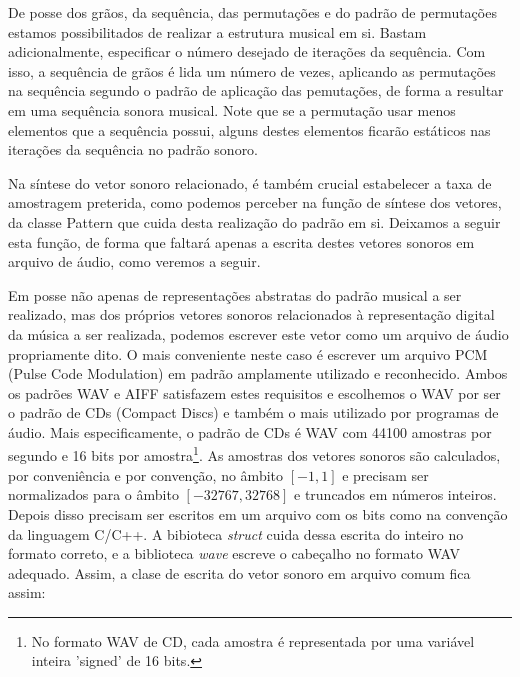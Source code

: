 
De posse dos grãos, da sequência, das permutações e do padrão de permutações estamos possibilitados de realizar a estrutura musical em si. Bastam adicionalmente, especificar o número desejado de iterações da sequência. Com isso, a sequência de grãos é lida um número de vezes, aplicando as permutações na sequência segundo o padrão de aplicação das pemutações, de forma a resultar em uma sequência sonora musical. Note que se a permutação usar menos elementos que a sequência possui, alguns destes elementos ficarão estáticos nas iterações da sequência no padrão sonoro.

Na síntese do vetor sonoro relacionado, é também crucial estabelecer a taxa de amostragem preterida, como podemos perceber na função de síntese dos vetores, da classe Pattern que cuida desta realização do padrão em si. Deixamos a seguir esta função, de forma que faltará apenas a escrita destes vetores sonoros em arquivo de áudio, como veremos a seguir.


Em posse não apenas de representações abstratas do padrão musical a ser realizado, mas dos próprios vetores sonoros relacionados à representação digital da música a ser realizada, podemos escrever este vetor como um arquivo de áudio propriamente dito. O mais conveniente neste caso é escrever um arquivo PCM (Pulse Code Modulation) em padrão amplamente utilizado e reconhecido. Ambos os padrões WAV e AIFF satisfazem estes requisitos e escolhemos o WAV por ser o padrão de CDs (Compact Discs) e também o mais utilizado por programas de áudio. Mais especificamente, o padrão de CDs é WAV com 44100 amostras por segundo e 16 bits por amostra\footnote{No formato WAV de CD, cada amostra é representada por uma variável inteira 'signed' de 16 bits.}. As amostras dos vetores sonoros são calculados, por conveniência e por convenção, no âmbito $[-1,1]$ e precisam ser normalizados para o âmbito $[-32767,32768]$ e truncados em números inteiros. Depois disso precisam ser escritos em um arquivo com os bits como na convenção da linguagem C/C++. A bibioteca \emph{struct} cuida dessa escrita do inteiro no formato correto, e a biblioteca \emph{wave} escreve o cabeçalho no formato WAV adequado. Assim, a clase de escrita do vetor sonoro em arquivo comum fica assim:




